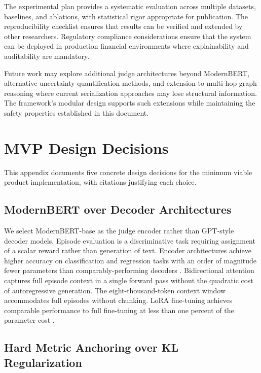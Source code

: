 \documentclass[11pt,a4paper]{article}
\begin{document}
The experimental plan provides a systematic evaluation across multiple datasets, baselines, and ablations, with statistical rigor appropriate for publication. The reproducibility checklist ensures that results can be verified and extended by other researchers. Regulatory compliance considerations ensure that the system can be deployed in production financial environments where explainability and auditability are mandatory.

Future work may explore additional judge architectures beyond ModernBERT, alternative uncertainty quantification methods, and extension to multi-hop graph reasoning where current serialization approaches may lose structural information. The framework's modular design supports such extensions while maintaining the safety properties established in this document.




\appendix

\section{MVP Design Decisions}

This appendix documents five concrete design decisions for the minimum viable product implementation, with citations justifying each choice.

\subsection{ModernBERT over Decoder Architectures}

We select ModernBERT-base as the judge encoder rather than GPT-style decoder models. Episode evaluation is a discriminative task requiring assignment of a scalar reward rather than generation of text. Encoder architectures achieve higher accuracy on classification and regression tasks with an order of magnitude fewer parameters than comparably-performing decoders \citep{warner2024modernbert}. Bidirectional attention captures full episode context in a single forward pass without the quadratic cost of autoregressive generation. The eight-thousand-token context window accommodates full episodes without chunking. LoRA fine-tuning achieves comparable performance to full fine-tuning at less than one percent of the parameter cost \citep{hu2021lora}.

\subsection{Hard Metric Anchoring over KL Regularization}
\end{document}

